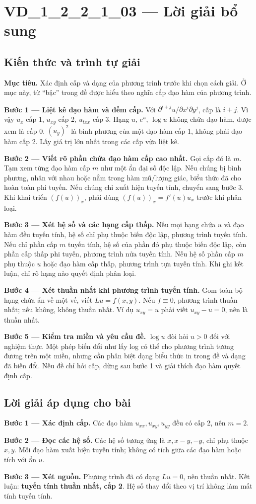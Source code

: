 \documentclass[10pt,a4paper]{article}
\begin{document}
\section*{VD\_1\_2\_2\_1\_03 — Lời giải bổ sung}
\subsection*{Kiến thức và trình tự giải}
\textbf{Mục tiêu.} Xác định cấp và dạng của phương trình trước khi chọn cách giải. Ở mục này, từ “bậc” trong đề được hiểu theo nghĩa cấp đạo hàm của phương trình.

\textbf{Bước 1 — Liệt kê đạo hàm và đếm cấp.} Với $\partial^{i+j}u/\partial x^i\partial y^j$, cấp là $i+j$. Vì vậy $u_x$ cấp 1, $u_{xy}$ cấp 2, $u_{txx}$ cấp 3. Hạng $u$, $e^u$, $\log u$ không chứa đạo hàm, được xem là cấp 0. $(u_y)^2$ là bình phương của một đạo hàm cấp 1, không phải đạo hàm cấp 2. Lấy giá trị lớn nhất trong các cấp vừa liệt kê.

\textbf{Bước 2 — Viết rõ phần chứa đạo hàm cấp cao nhất.} Gọi cấp đó là $m$. Tạm xem từng đạo hàm cấp $m$ như một ẩn đại số độc lập. Nếu chúng bị bình phương, nhân với nhau hoặc nằm trong hàm mũ/lượng giác, biểu thức đã cho hoàn toàn phi tuyến. Nếu chúng chỉ xuất hiện tuyến tính, chuyển sang bước 3. Khi khai triển $(f(u))_x$, phải dùng $(f(u))_x=f'(u)u_x$ trước khi phân loại.

\textbf{Bước 3 — Xét hệ số và các hạng cấp thấp.} Nếu mọi hạng chứa $u$ và đạo hàm đều tuyến tính, hệ số chỉ phụ thuộc biến độc lập, phương trình tuyến tính. Nếu chỉ phần cấp $m$ tuyến tính, hệ số của phần đó phụ thuộc biến độc lập, còn phần cấp thấp phi tuyến, phương trình nửa tuyến tính. Nếu hệ số phần cấp $m$ phụ thuộc $u$ hoặc đạo hàm cấp thấp, phương trình tựa tuyến tính. Khi ghi kết luận, chỉ rõ hạng nào quyết định phân loại.

\textbf{Bước 4 — Xét thuần nhất khi phương trình tuyến tính.} Gom toàn bộ hạng chứa ẩn về một vế, viết $Lu=f(x,y)$. Nếu $f\equiv0$, phương trình thuần nhất; nếu không, không thuần nhất. Ví dụ $u_{xy}=u$ phải viết $u_{xy}-u=0$, nên là thuần nhất.

\textbf{Bước 5 — Kiểm tra miền và yêu cầu đề.} $\log u$ đòi hỏi $u>0$ đối với nghiệm thực. Một phép biến đổi như lấy log có thể cho phương trình tương đương trên một miền, nhưng cần phân biệt dạng biểu thức in trong đề và dạng đã biến đổi. Nếu đề chỉ hỏi cấp, dừng sau bước 1 và giải thích đạo hàm quyết định cấp.
\subsection*{Lời giải áp dụng cho bài}
\textbf{Bước 1 — Xác định cấp.} Các đạo hàm $u_{xx},u_{xy},u_{yy}$ đều có cấp 2, nên $m=2$.

\textbf{Bước 2 — Đọc các hệ số.} Các hệ số tương ứng là $x,x-y,-y$, chỉ phụ thuộc $x,y$. Mỗi đạo hàm xuất hiện tuyến tính; không có tích giữa các đạo hàm hoặc tích với ẩn $u$.

\textbf{Bước 3 — Xét nguồn.} Phương trình đã có dạng $Lu=0$, nên thuần nhất. Kết luận: \textbf{tuyến tính thuần nhất, cấp 2}. Hệ số thay đổi theo vị trí không làm mất tính tuyến tính.
\end{document}
